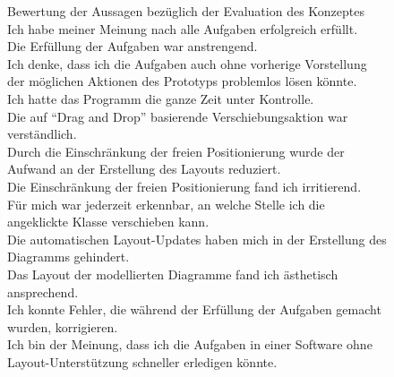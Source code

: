 \begin{figure}[!ht]
\newcommand{\captionvalue}{Bewertung der Aussagen bezüglich der Evaluation des Konzeptes}
\caption[\captionvalue]{
\captionvalue
\\\hspace{\textwidth}
 Ich habe meiner Meinung nach alle Aufgaben erfolgreich erfüllt.
\\\hspace{\textwidth}
 Die Erfüllung der Aufgaben war anstrengend.
\\\hspace{\textwidth}
 Ich denke, dass ich die Aufgaben auch ohne vorherige Vorstellung der möglichen Aktionen des Prototyps problemlos lösen könnte.
\\\hspace{\textwidth}
 Ich hatte das Programm die ganze Zeit unter Kontrolle.
\\\hspace{\textwidth}
 Die auf \enquote{Drag and Drop} basierende Verschiebungsaktion war verständlich.
\\\hspace{\textwidth}
 Durch die Einschränkung der freien Positionierung wurde der Aufwand an der Erstellung des Layouts reduziert.
\\\hspace{\textwidth}
 Die Einschränkung der freien Positionierung fand ich irritierend.
\\\hspace{\textwidth}
 Für mich war jederzeit erkennbar, an welche Stelle ich die angeklickte Klasse verschieben kann.
\\\hspace{\textwidth}
 Die automatischen Layout-Updates haben mich in der Erstellung des Diagramms gehindert.
\\\hspace{\textwidth}
 Das Layout der modellierten Diagramme fand ich ästhetisch ansprechend.
\\\hspace{\textwidth}
 Ich konnte Fehler, die während der Erfüllung der Aufgaben gemacht wurden, korrigieren.
\\\hspace{\textwidth}
 Ich bin der Meinung, dass ich die Aufgaben in einer Software ohne Layout-Unterstützung schneller erledigen könnte.
}
\label{fig:evaluation-charts}

\end{figure}

